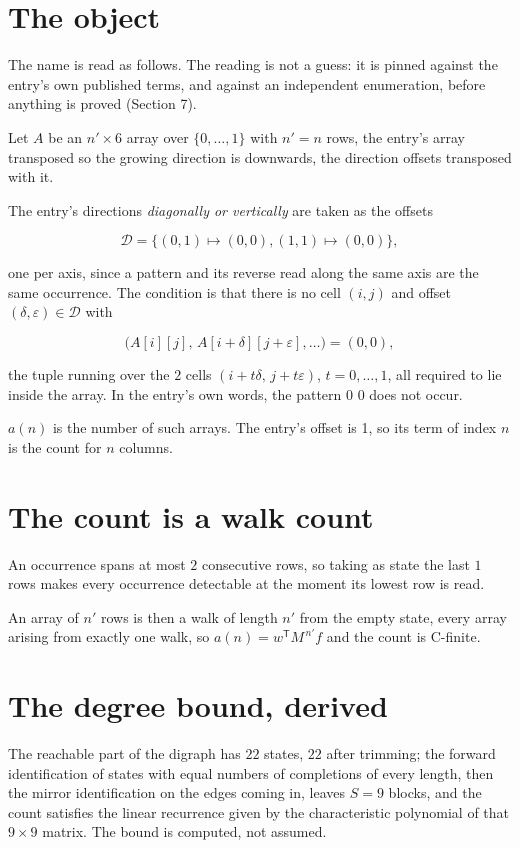 \documentclass[11pt]{article}
\theoremstyle{definition}
\begin{document}
\section{The object}

The name is read as follows. The reading is not a guess: it is pinned against the entry's own published terms, and against an independent enumeration, before anything is proved (Section 7).

Let $A$ be an $n' \times 6$ array over $\{0,\dots,1\}$ with $n' = n$ rows, the entry's array transposed so the growing direction is downwards, the direction offsets transposed with it.

The entry's directions {\itshape diagonally or vertically} are taken as the offsets

\[\mathcal{D} = \{(0,1)\mapsto(0,0), (1,1)\mapsto(0,0)\},\]

one per axis, since a pattern and its reverse read along the same axis are the same occurrence. The condition is that there is no cell $(i,j)$ and offset $(\delta,\varepsilon)\in\mathcal{D}$ with

\[\bigl(A[i][j],\,A[i{+}\delta][j{+}\varepsilon],\dots\bigr) = (0, 0),\]

the tuple running over the $2$ cells $(i+t\delta,\,j+t\varepsilon)$, $t = 0,\dots,1$, all required to lie inside the array. In the entry's own words, the pattern 0 0 does not occur.

$a(n)$ is the number of such arrays. The entry's offset is 1, so its term of index $n$ is the count for $n$ columns.

\section{The count is a walk count}

An occurrence spans at most $2$ consecutive rows, so taking as state the last $1$ rows makes every occurrence detectable at the moment its lowest row is read.

An array of $n'$ rows is then a walk of length $n'$ from the empty state, every array arising from exactly one walk, so $a(n) = w^{\mathsf T}M^{\,n'}f$ and the count is C-finite.

\section{The degree bound, derived}

The reachable part of the digraph has $22$ states, $22$ after trimming; the forward identification of states with equal numbers of completions of every length, then the mirror identification on the edges coming in, leaves $S = 9$ blocks, and the count satisfies the linear recurrence given by the characteristic polynomial of that $9\times9$ matrix. The bound is computed, not assumed.
\end{document}
